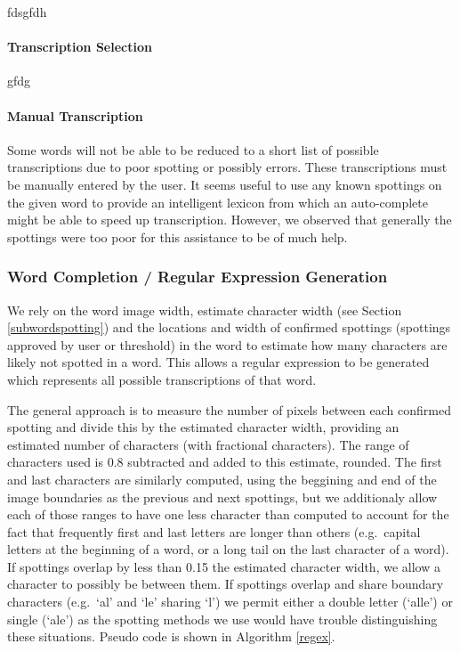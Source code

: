 \documentclass[ms,electronic,twosidetoc,letterpaper,chaptercenter,parttop,lol,lof,lot]{byumsphd}
\begin{document}
fdsgfdh
\fi

\paragraph{Transcription Selection}
gfdg

\paragraph{Manual Transcription}
Some words will not be able to be reduced to a short list of possible transcriptions due to poor spotting or possibly errors. These transcriptions must be manually entered by the user. It seems useful to use any known spottings on the given word to provide an intelligent lexicon from which an auto-complete might be able to speed up transcription. However, we observed that generally the spottings were too poor for this assistance to be of much help.


\subsubsection{Word Completion / Regular Expression Generation}
We rely on the word image width, estimate character width (see Section \ref{subwordspotting}) and the locations and width of confirmed spottings (spottings approved by user or threshold) in the word to estimate how many characters are likely not spotted in a word. This allows a regular expression to be generated which represents all possible transcriptions of that word.



The general approach is to measure the number of pixels between each confirmed spotting and divide this by the estimated character width, providing an estimated number of characters (with fractional characters). The range of characters used is 0.8 subtracted and added to this estimate, rounded. The first and last characters are similarly computed, using the beggining and end of the image boundaries as the previous and next spottings, but we additionaly allow each of those ranges to have one less character than computed to account for the fact that frequently first and last letters are longer than others (e.g.~capital letters at the beginning of a word, or a long tail on the last character of a word). If spottings overlap by less than 0.15 the estimated character width, we allow a character to possibly be between them. If spottings overlap and share boundary characters (e.g.~`al' and `le' sharing `l') we permit either a double letter (`alle') or single (`ale') as the spotting methods we use would have trouble distinguishing these situations. Pseudo code is shown in Algorithm \ref{regex}.
\end{document}
